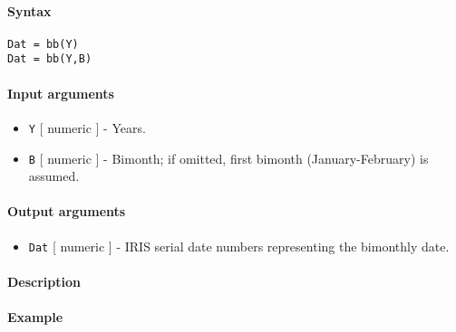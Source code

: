 


	\paragraph{Syntax}\label{syntax}

\begin{verbatim}
Dat = bb(Y)
Dat = bb(Y,B)
\end{verbatim}

\paragraph{Input arguments}\label{input-arguments}

\begin{itemize}
\item
  \texttt{Y} {[} numeric {]} - Years.
\item
  \texttt{B} {[} numeric {]} - Bimonth; if omitted, first bimonth
  (January-February) is assumed.
\end{itemize}

\paragraph{Output arguments}\label{output-arguments}

\begin{itemize}
\itemsep1pt\parskip0pt
\item
  \texttt{Dat} {[} numeric {]} - IRIS serial date numbers representing
  the bimonthly date.
\end{itemize}

\paragraph{Description}\label{description}

\paragraph{Example}\label{example}


